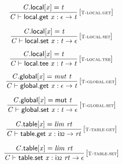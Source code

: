 $$
\begin{array}{@{}c@{}}\displaystyle
\frac{
{\mathit{C}}.\mathsf{local}{}[{\mathit{x}}] = {\mathit{t}}
}{
{\mathit{C}} \vdash \mathsf{local.get}~{\mathit{x}} : \epsilon \rightarrow {\mathit{t}}
} \, {[\textsc{\scriptsize T{-}local.get}]}
\qquad
\end{array}
$$

$$
\begin{array}{@{}c@{}}\displaystyle
\frac{
{\mathit{C}}.\mathsf{local}{}[{\mathit{x}}] = {\mathit{t}}
}{
{\mathit{C}} \vdash \mathsf{local.set}~{\mathit{x}} : {\mathit{t}} \rightarrow \epsilon
} \, {[\textsc{\scriptsize T{-}local.set}]}
\qquad
\end{array}
$$

$$
\begin{array}{@{}c@{}}\displaystyle
\frac{
{\mathit{C}}.\mathsf{local}{}[{\mathit{x}}] = {\mathit{t}}
}{
{\mathit{C}} \vdash \mathsf{local.tee}~{\mathit{x}} : {\mathit{t}} \rightarrow {\mathit{t}}
} \, {[\textsc{\scriptsize T{-}local.tee}]}
\qquad
\end{array}
$$

\vspace{1ex}

$$
\begin{array}{@{}c@{}}\displaystyle
\frac{
{\mathit{C}}.\mathsf{global}{}[{\mathit{x}}] = {\mathit{mut}}~{\mathit{t}}
}{
{\mathit{C}} \vdash \mathsf{global.get}~{\mathit{x}} : \epsilon \rightarrow {\mathit{t}}
} \, {[\textsc{\scriptsize T{-}global.get}]}
\qquad
\end{array}
$$

$$
\begin{array}{@{}c@{}}\displaystyle
\frac{
{\mathit{C}}.\mathsf{global}{}[{\mathit{x}}] = \mathsf{mut}~{\mathit{t}}
}{
{\mathit{C}} \vdash \mathsf{global.set}~{\mathit{x}} : {\mathit{t}} \rightarrow \epsilon
} \, {[\textsc{\scriptsize T{-}global.set}]}
\qquad
\end{array}
$$

\vspace{1ex}

$$
\begin{array}{@{}c@{}}\displaystyle
\frac{
{\mathit{C}}.\mathsf{table}{}[{\mathit{x}}] = {\mathit{lim}}~{\mathit{rt}}
}{
{\mathit{C}} \vdash \mathsf{table.get}~{\mathit{x}} : \mathsf{i{\scriptstyle32}} \rightarrow {\mathit{rt}}
} \, {[\textsc{\scriptsize T{-}table.get}]}
\qquad
\end{array}
$$

$$
\begin{array}{@{}c@{}}\displaystyle
\frac{
{\mathit{C}}.\mathsf{table}{}[{\mathit{x}}] = {\mathit{lim}}~{\mathit{rt}}
}{
{\mathit{C}} \vdash \mathsf{table.set}~{\mathit{x}} : \mathsf{i{\scriptstyle32}}~{\mathit{rt}} \rightarrow \epsilon
} \, {[\textsc{\scriptsize T{-}table.set}]}
\qquad
\end{array}
$$

